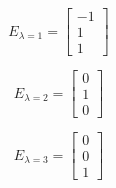\documentclass[a4paper, 12pt]{article}
\begin{document}
{\begin{enumerate}
	\begin{minipage}[t]{0.3\textwidth}	
	\[
		E_{\lambda = 1} = \begin{bmatrix}
		-1 \\ 1 \\ 1
		\end{bmatrix}
	\]
	\end{minipage} \quad \vline \quad \begin{minipage}[t]{0.3\textwidth}	
	\[
		E_{\lambda = 2} = \begin{bmatrix}
		0 \\ 1 \\ 0
		\end{bmatrix}
	\]
	\end{minipage} \quad \vline \quad \begin{minipage}[t]{0.3\textwidth}	
	\[
		E_{\lambda = 3} = \begin{bmatrix}
		0 \\ 0 \\ 1
		\end{bmatrix}
	\]
	\end{minipage}
	
    \end{enumerate}
	}    
    
    
\end{document}
